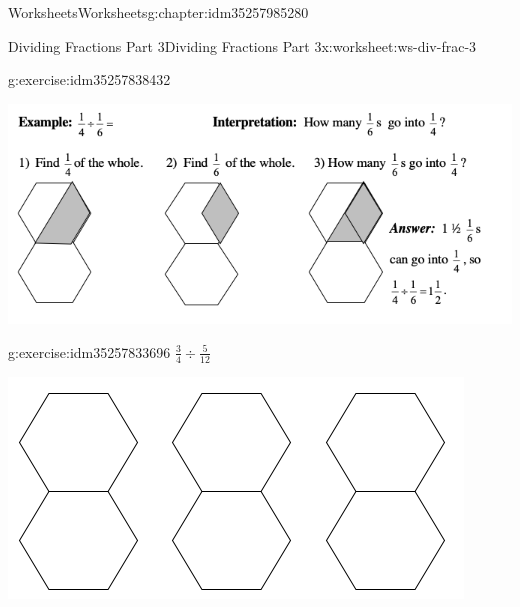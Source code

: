 \documentclass[twoside,11pt,]{book}
\begin{document}
\begin{chapterptx}{Worksheets}{}{Worksheets}{}{}{g:chapter:idm35257985280}
\begin{worksheet-section-numberless}{Dividing Fractions Part 3}{}{Dividing Fractions Part 3}{}{}{x:worksheet:ws-div-frac-3}
\begin{divisionexercise}{2}{}{}{g:exercise:idm35257838432}
\begin{sidebyside}{1}{0.15}{0.15}{0}
\begin{sbspanel}{0.7}
\end{sbspanel}%
\end{sidebyside}%
\end{divisionexercise}%
\clearpage
\begin{introduction}{}%
\begin{sidebyside}{1}{0}{0}{0}%
\begin{sbspanel}{1}%
\includegraphics[width=1\linewidth]{images/frac-div-hex-3.png}
\end{sbspanel}%
\end{sidebyside}%
\end{introduction}%
\begin{divisionexercise}{3}{}{}{g:exercise:idm35257833696}%
\(\frac{3}{4} \div \frac{5}{12} \)%
\begin{sidebyside}{1}{0.15}{0.15}{0}%
\begin{sbspanel}{0.7}%
\includegraphics[width=1\linewidth]{images/3-double-hexagons.png}
\end{sbspanel}%
\end{sidebyside}%
\end{divisionexercise}%
\end{worksheet-section-numberless}
\restoregeometry
%
%
\typeout{************************************************}
\typeout{************************************************}

\end{chapterptx}
\end{document}
